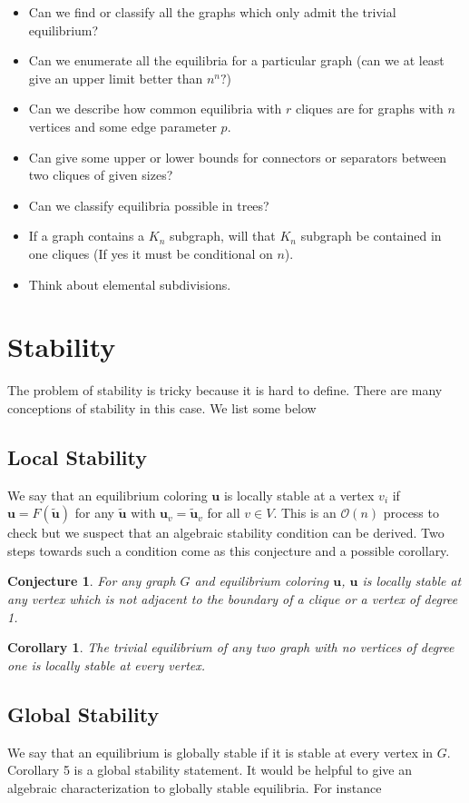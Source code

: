 \documentclass[]{article}
\newtheorem{conjecture}[theorem]{Conjecture}
\newtheorem{corrollary}[theorem]{Corollary}
\begin{document}
\begin{itemize}
	\item Can we find or classify all the graphs which only admit the trivial equilibrium? 
	\item Can we enumerate all the equilibria for a particular graph (can we at least give an upper limit better than $n^n?$)
	\item Can we describe how common equilibria with $r$ cliques are for graphs with $n$ vertices and some edge parameter $p$. 
	\item Can give some upper or lower bounds for connectors or separators between two cliques of given sizes?
	\item Can we classify equilibria possible in trees?
	\item If a graph contains a $K_n$ subgraph, will that $K_n$ subgraph be contained in one cliques (If yes it must be conditional on $n$).
	\item Think about elemental subdivisions. 
\end{itemize}
\section{Stability}
The problem of stability is tricky because it is hard to define. There are many conceptions of stability in this case. We list some below
\subsection{Local Stability} We say that an equilibrium coloring $\mathbf{u}$ is locally stable at a vertex $v_i$ if $\mathbf{u}=F(\tilde{\mathbf{u}})$ for any $\tilde{\mathbf{u}}$ with $\mathbf{u}_{v}=\tilde{\mathbf{u}}_{v}$ for all $v\in V$. This is an $\mathcal{O}(n)$ process to check but we suspect that an algebraic stability condition can be derived. Two steps towards such a condition come as this conjecture and a possible corollary.
\begin{conjecture}
	For any graph $G$ and equilibrium coloring $\mathbf{u}$, $\mathbf{u}$ is locally stable at any vertex which is not adjacent to the boundary of a clique or a vertex of degree 1. 
\end{conjecture} 
\begin{corrollary}
	The trivial equilibrium of any two graph with no vertices of degree one is locally stable at every vertex.
\end{corrollary}
\subsection{Global Stability}
We say that an equilibrium is globally stable if it is stable at every vertex in $G$. Corollary 5 is a global stability statement. It would be helpful to give an algebraic characterization to globally stable equilibria. For instance
\end{document}
